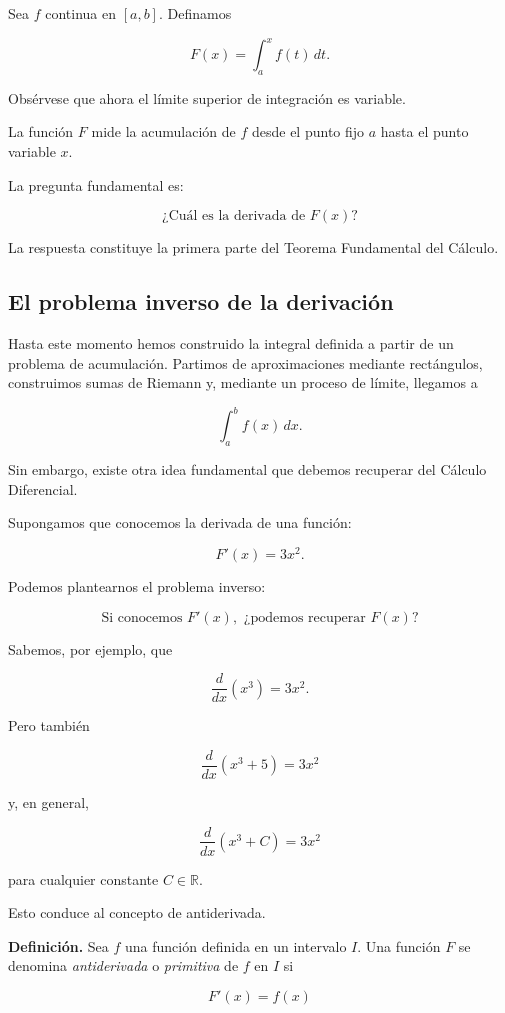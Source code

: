\documentclass[12pt]{article}
\begin{document}
Sea $f$ continua en $[a,b]$. Definamos

\[
F(x)
=
\int_a^x f(t)\,dt.
\]

Obsérvese que ahora el límite superior de integración es variable.

La función $F$ mide la acumulación de $f$ desde el punto fijo $a$ hasta
el punto variable $x$.

La pregunta fundamental es:

\[
\boxed{\text{¿Cuál es la derivada de }F(x)?}
\]

La respuesta constituye la primera parte del Teorema Fundamental del
Cálculo.
\subsection{El problema inverso de la derivación}

Hasta este momento hemos construido la integral definida a partir de un
problema de acumulación. Partimos de aproximaciones mediante rectángulos,
construimos sumas de Riemann y, mediante un proceso de límite, llegamos a

\[
\int_a^b f(x)\,dx.
\]

Sin embargo, existe otra idea fundamental que debemos recuperar del
Cálculo Diferencial.

Supongamos que conocemos la derivada de una función:

\[
F'(x)=3x^2.
\]

Podemos plantearnos el problema inverso:

\[
\boxed{
\text{Si conocemos }F'(x),\text{ ¿podemos recuperar }F(x)?
}
\]

Sabemos, por ejemplo, que

\[
\frac{d}{dx}(x^3)=3x^2.
\]

Pero también

\[
\frac{d}{dx}(x^3+5)=3x^2
\]

y, en general,

\[
\frac{d}{dx}(x^3+C)=3x^2
\]

para cualquier constante $C\in\mathbb{R}$.

Esto conduce al concepto de antiderivada.

\textbf{Definición.}
Sea $f$ una función definida en un intervalo $I$. Una función $F$ se
denomina \emph{antiderivada} o \emph{primitiva} de $f$ en $I$ si

\[
F'(x)=f(x)
\]
\end{document}
